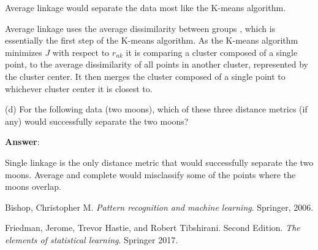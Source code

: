 \documentclass[a4paper]{article}
\begin{document}
Average linkage would separate the data most like the K-means algorithm.

Average linkage uses the average dissimilarity between groups \cite{friedman},  which is essentially the first step of the K-means algorithm.  As the K-means algorithm minimizes $J$ with respect to $r_{nk}$ it is comparing a cluster composed of a single point, to the average dissimilarity of all points in another cluster, represented by the cluster center.  It then merges the cluster composed of a single point to whichever cluster center it is closest to.


(d) For the following data (two moons), which of these three distance metrics (if any) would
successfully separate the two moons?

\textbf{Answer}:

Single linkage is the only distance metric that would successfully separate the two moons.  Average and complete would misclassify some of the points where the moons overlap.

\begin{thebibliography}{9}
Bishop, Christopher M. 
\textit{Pattern recognition and machine learning}. 
Springer, 2006.
 
Friedman, Jerome, Trevor Hastie, and Robert Tibshirani. Second Edition. 
\textit{The elements of statistical learning}. 
Springer 2017.
\end{thebibliography}
\end{document}
